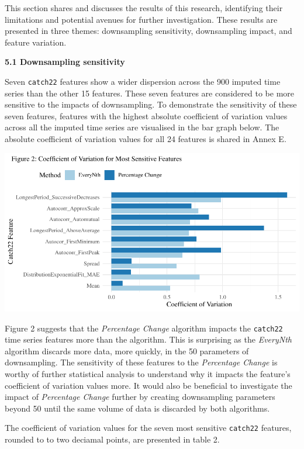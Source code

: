 \documentclass{article}
\begin{document}
\vspace{-0.4cm}

This section shares and discusses the results of this research,
identifying their limitations and potential avenues for further
investigation. These results are presented in three themes: downsampling
sensitivity, downsampling impact, and feature variation.

\newpage

\textbf{5.1 Downsampling sensitivity}

Seven \texttt{catch22} features show a wider dispersion across the 900
imputed time series than the other 15 features. These seven features are
considered to be more sensitive to the impacts of downsampling. To
demonstrate the sensitivity of these seven features, features with the
highest absolute coefficient of variation values across all the imputed
time series are visualised in the bar graph below. The absolute
coefficient of variation values for all 24 features is shared in Annex
E.

\includegraphics{210431461_CSC8639_Dissertation_files/figure-latex/CombinedSensitivity-1.pdf}

Figure 2 suggests that the \emph{Percentage Change} algorithm impacts
the \texttt{catch22} time series features more than the algorithm. This
is surprising as the \emph{EveryNth} algorithm discards more data, more
quickly, in the 50 parameters of downsampling. The sensitivity of these
features to the \emph{Percentage Change} is worthy of further
statistical analysis to understand why it impacts the feature's
coefficient of variation values more. It would also be beneficial to
investigate the impact of \emph{Percentage Change} further by creating
downsampling parameters beyond 50 until the same volume of data is
discarded by both algorithms.

The coefficient of variation values for the seven most sensitive
\texttt{catch22} features, rounded to to two deciamal points, are
presented in table 2.
\end{document}
